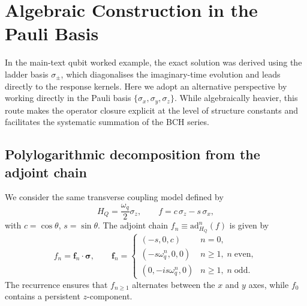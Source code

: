 ﻿%
\section{Algebraic Construction in the Pauli Basis}
\label{app:algebraic_closure_qubit}

In the main-text qubit worked example, the exact solution was derived using the ladder basis $\sigma_\pm$, which diagonalises the imaginary-time evolution and leads directly to the response kernels. Here we adopt an alternative perspective by working directly in the Pauli basis $\{\sigma_x, \sigma_y, \sigma_z\}$. While algebraically heavier, this route makes the operator closure explicit at the level of structure constants and facilitates the systematic summation of the BCH series.

\subsection{Polylogarithmic decomposition from the adjoint chain}
\label{appalg:adjoint_chain}

We consider the same transverse coupling model defined by
\begin{equation}
    H_Q=\frac{\omega_q}{2}\sigma_z,\qquad
    f=c\,\sigma_z-s\,\sigma_x,
    \label{eq:qubit_setup_appalg}
\end{equation}
with $c=\cos\theta$, $s=\sin\theta$. The adjoint chain $f_n \equiv \mathrm{ad}_{H_Q}^n(f)$ is given by
\begin{equation}
    f_n = \mathbf{f}_n\cdot\boldsymbol{\sigma}, \qquad
    \mathbf{f}_n = \begin{cases}
        (-s,0,c) & n=0, \\
        (-s\omega_q^n,0,0) & n\ge1,\; n\;\text{even}, \\
        (0,-is\omega_q^n,0) & n\ge1,\; n\;\text{odd}.
    \end{cases}
    \label{eq:vn_qubit_appalg}
\end{equation}
The recurrence ensures that $f_{n\ge 1}$ alternates between the $x$ and $y$ axes, while $f_0$ contains a persistent $z$-component.

